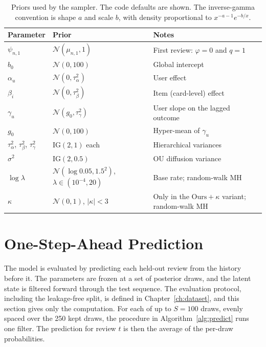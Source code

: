 \begin{table}[htbp]
  \centering
  \caption{Priors used by the sampler. The code defaults are shown. The inverse-gamma convention
    is shape $a$ and scale $b$, with density proportional to $x^{-a-1}e^{-b/x}$.}
  \label{tab:priors}
  \begin{tabular}{@{}>{\raggedright\arraybackslash}p{2.7cm}>{\raggedright\arraybackslash}p{5.4cm}>{\raggedright\arraybackslash}p{5.7cm}@{}}
    \toprule
    \textbf{Parameter} & \textbf{Prior} & \textbf{Notes}\\
    \midrule
    $\psi_{n,1}$ & $\mathcal N(\mu_{n,1}, 1)$ & First review: $\varphi = 0$ and $q = 1$\\
    $b_0$ & $\mathcal N(0, 100)$ & Global intercept\\
    $\alpha_u$ & $\mathcal N(0, \tau^2_\alpha)$ & User effect\\
    $\beta_i$ & $\mathcal N(0, \tau^2_\beta)$ & Item (card-level) effect\\
    $\gamma_u$ & $\mathcal N(g_0, \tau^2_\gamma)$ & User slope on the lagged outcome\\
    $g_0$ & $\mathcal N(0, 100)$ & Hyper-mean of $\gamma_u$\\
    $\tau^2_\alpha$, $\tau^2_\beta$, $\tau^2_\gamma$ & $\mathrm{IG}(2, 1)$ each & Hierarchical variances\\
    $\sigma^2$ & $\mathrm{IG}(2, 0.5)$ & OU diffusion variance\\
    $\log\lambda$ & $\mathcal N(\log 0.05, 1.5^2)$, $\lambda \in (10^{-4}, 20)$ & Base rate; random-walk MH\\
    $\kappa$ & $\mathcal N(0, 1)$, $\lvert\kappa\rvert < 3$ & Only in the $\text{Ours}+\kappa$ variant; random-walk MH\\
    \bottomrule
  \end{tabular}
\end{table}

\section{One-Step-Ahead Prediction}
\label{sec:method-prediction}

The model is evaluated by predicting each held-out review from the history before it. The parameters
are frozen at a set of posterior draws, and the latent state is filtered forward through the test
sequence. The evaluation protocol, including the leakage-free split, is defined in Chapter~\ref{ch:dataset}, and this section gives only the computation. For each of up to $S = 100$ draws, evenly spaced over the 250 kept draws, the procedure in Algorithm~\ref{alg:predict} runs one
filter. The prediction for review $t$ is then the average of the per-draw probabilities.

